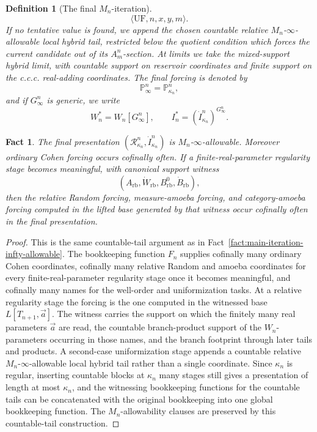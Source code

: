 \documentclass[a4paper,11pt]{article}
\newtheorem{definition}[theorem]{Definition}
\newtheorem{fact}[theorem]{Fact}
\begin{document}
\begin{definition}[The final $M_n$-iteration]
\[
   \langle\mathrm{UF},n,x,y,m\rangle .
\]
If no tentative value is found, we append the chosen countable relative $M_n$-$\infty$-allowable local hybrid tail, restricted below the quotient condition which forces the current candidate out of its $A^n_m$-section.  At limits we take the mixed-support hybrid limit, with countable support on reservoir coordinates and finite support on the c.c.c. real-adding coordinates.  The final forcing is denoted by
\[
   \mathbb P^n_\infty=\mathbb P^n_{\kappa_n},
\]
and if $G^n_\infty$ is generic, we write
\[
   W_n^\ast=W_n[G^n_\infty],
   \qquad
   I_n^\ast=(\dot I^n_{\kappa_n})^{G^n_\infty}.
\]
\end{definition}

\begin{fact}\label{fact:main-iteration-mn-infty-allowable}
The final presentation $(\mathcal R^n_{\kappa_n},\dot I^n_{\kappa_n})$ is $M_n$-$\infty$-allowable.  Moreover ordinary Cohen forcing occurs cofinally often.  If a finite-real-parameter regularity stage becomes meaningful, with canonical support witness
\[
   (A_{\mathrm{rb}},\dot W_{\mathrm{rb}},B^0_{\mathrm{rb}},\dot B_{\mathrm{rb}}),
\]
then the relative Random forcing, measure-amoeba forcing, and category-amoeba forcing computed in the lifted base generated by that witness occur cofinally often in the final presentation.
\end{fact}

\begin{proof}
This is the same countable-tail argument as in Fact~\ref{fact:main-iteration-infty-allowable}.  The bookkeeping function $F_n$ supplies cofinally many ordinary Cohen coordinates, cofinally many relative Random and amoeba coordinates for every finite-real-parameter regularity stage once it becomes meaningful, and cofinally many names for the well-order and uniformization tasks.  At a relative regularity stage the forcing is the one computed in the witnessed base \(L[T_{n+1},\vec a]\).  The witness carries the support on which the finitely many real parameters \(\vec a\) are read, the countable branch-product support of the \(W_n\)-parameters occurring in those names, and the branch footprint through later tails and products.  A second-case uniformization stage appends a countable relative $M_n$-$\infty$-allowable local hybrid tail rather than a single coordinate.  Since $\kappa_n$ is regular, inserting countable blocks at $\kappa_n$ many stages still gives a presentation of length at most $\kappa_n$, and the witnessing bookkeeping functions for the countable tails can be concatenated with the original bookkeeping into one global bookkeeping function.  The $M_n$-allowability clauses are preserved by this countable-tail construction.
\end{proof}
\end{document}
